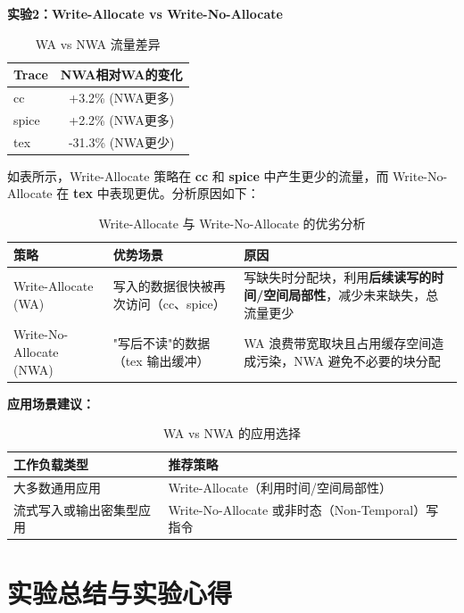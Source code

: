 \documentclass[12pt,a4paper]{article}
\begin{document}
\textbf{实验2：Write-Allocate vs Write-No-Allocate}

\begin{table}[H]
\centering
\caption{WA vs NWA 流量差异}
\begin{tabular}{|l|c|}
\hline
\textbf{Trace} & \textbf{NWA相对WA的变化} \\
\hline
cc & +3.2\% (NWA更多) \\
spice & +2.2\% (NWA更多) \\
tex & -31.3\% (NWA更少) \\
\hline
\end{tabular}
\end{table}

如表所示，Write-Allocate 策略在 \textbf{cc} 和 \textbf{spice} 中产生更少的流量，而 Write-No-Allocate 在 \textbf{tex} 中表现更优。分析原因如下：

\begin{table}[H]
\centering
\small
\caption{Write-Allocate 与 Write-No-Allocate 的优劣分析}
\begin{tabular}{p{3.5cm}p{5.5cm}p{5.5cm}}
\toprule
\textbf{策略} & \textbf{优势场景} & \textbf{原因} \\
\midrule
Write-Allocate (WA) & 写入的数据很快被再次访问（cc、spice） & 写缺失时分配块，利用\textbf{后续读写的时间/空间局部性}，减少未来缺失，总流量更少 \\
\midrule
Write-No-Allocate (NWA) & "写后不读"的数据（tex 输出缓冲） & WA 浪费带宽取块且占用缓存空间造成污染，NWA 避免不必要的块分配 \\
\bottomrule
\end{tabular}
\end{table}

\textbf{应用场景建议：}

\begin{table}[H]
\centering
\small
\caption{WA vs NWA 的应用选择}
\begin{tabular}{p{4cm}p{11cm}}
\toprule
\textbf{工作负载类型} & \textbf{推荐策略} \\
\midrule
大多数通用应用 & Write-Allocate（利用时间/空间局部性） \\
\midrule
流式写入或输出密集型应用 & Write-No-Allocate 或非时态（Non-Temporal）写指令 \\
\bottomrule
\end{tabular}
\end{table}

\clearpage
\section{实验总结与实验心得}
\end{document}

